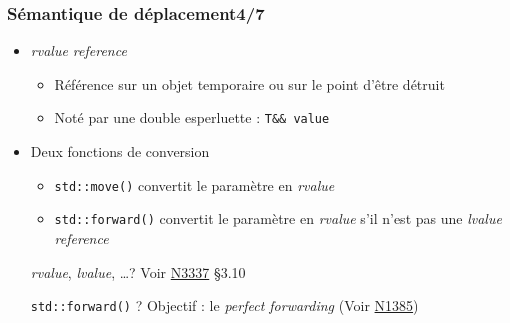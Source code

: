 \documentclass[C++.tex]{subfiles}
\begin{document}
\begin{frame}[fragile]
	\frametitle{Sémantique de déplacement\titlehfill{}4/7}
	\begin{itemize}
		\item \textit{rvalue reference}
		\begin{itemize}
			\item Référence sur un objet temporaire ou sur le point d'être détruit
			\item Noté par une double esperluette : \lstinline|T&& value|
		\end{itemize}
		\item Deux fonctions \og de conversion\fg{}
		\begin{itemize}
			\item \lstinline|std::move()| convertit le paramètre en \textit{rvalue}


			\item \lstinline|std::forward()| convertit le paramètre en \textit{rvalue} s'il n'est pas une \textit{lvalue reference}
		\end{itemize}

		\begin{block}{\textit{rvalue}, \textit{lvalue}, \ldots ?}
			Voir \href{http://www.open-std.org/jtc1/sc22/wg21/docs/papers/2012/n3337.pdf}{N3337} §3.10
		\end{block}

		\begin{block}{\lstinline|std::forward()| ?}
			Objectif : le \textit{perfect forwarding} (Voir \href{http://www.open-std.org/jtc1/sc22/wg21/docs/papers/2002/n1385.htm}{N1385})
		\end{block}
	\end{itemize}
\end{frame}
\end{document}
